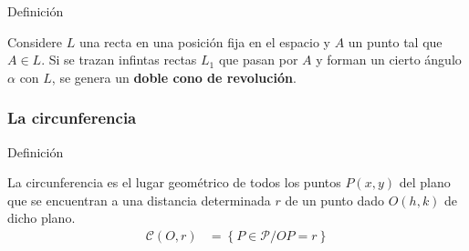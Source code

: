 \documentclass[12pt,spanish,x11names]{beamer}
\begin{document}
\begin{frame}
\begin{block}{Definición}
\begin{minipage}[t]{.4\linewidth}
  \end{minipage}
  \begin{minipage}[b]{.55\linewidth}
      Considere $L$ una recta en una posición fija en el espacio y $A$ un punto
      tal que $A\in L$. Si se trazan infintas rectas $L_1$ que pasan por $A$ y
      forman un cierto ángulo $\alpha$ con $L$, se genera un \textbf{doble cono
        de revolución}.
      \vspace{1cm}
  \end{minipage}
    \end{block}
\end{frame}
\begin{frame}
  \frametitle{La circunferencia}
  \begin{block}{Definición}
    \begin{minipage}[b]{.45\linewidth}
    \end{minipage}
    \begin{minipage}[b]{.45\linewidth}
      La circunferencia es el lugar geométrico de todos los puntos $P(x,y)$ del
      plano que se encuentran a una distancia determinada $r$ de un punto dado
      $O(h,k)$ de dicho plano.
      \begin{align*}
        \mathcal{C}(O,r)&=\left\{ P\in\mathcal{P}/OP=r \right\}
      \end{align*}
    \end{minipage}
  \end{block}
\end{frame}
\end{document}
